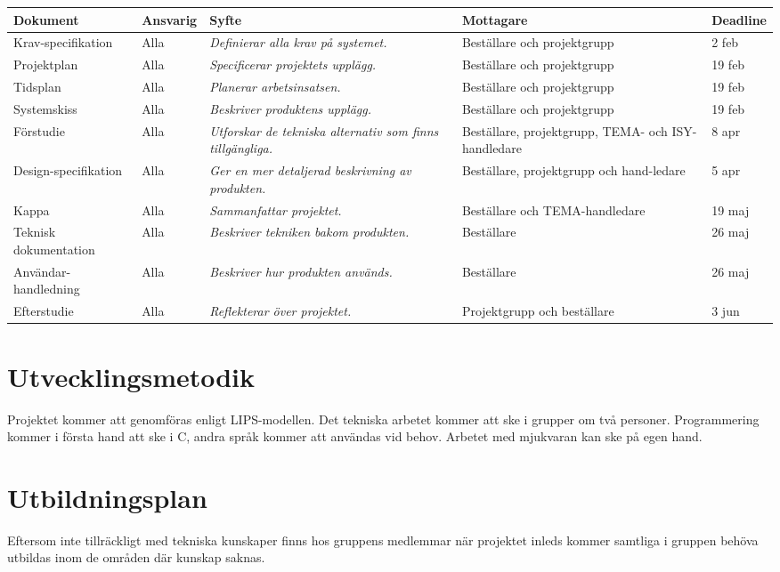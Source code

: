 \documentclass[11pt]{article}
\begin{document}
\begin{flushleft}
\begin{longtable}{| p{.17\linewidth} | p{.11\linewidth} | p{.31\linewidth} | p{.15\linewidth} | p{.11\linewidth} |} \hline
\textbf{Dokument} & \textbf{Ansvarig} & \textbf{Syfte} & \textbf{Mottagare} & \textbf{Deadline} \\ \hline
Krav-specifikation & Alla & \textit{Definierar alla krav på systemet.} & Beställare och projektgrupp & 2 feb \\ \hline
Projektplan & Alla & \textit{Specificerar projektets upplägg.} & Beställare och projektgrupp & 19 feb \\ \hline
Tidsplan & Alla & \textit{Planerar arbetsinsatsen.} & Beställare och projektgrupp & 19 feb \\ \hline
Systemskiss & Alla & \textit{Beskriver produktens upplägg.} & Beställare och projektgrupp & 19 feb \\ \hline
Förstudie & Alla & \textit{Utforskar de tekniska alternativ som finns tillgängliga.} & Beställare, projektgrupp, TEMA- och ISY-handledare & 8 apr \\ \hline
Design-specifikation & Alla & \textit{Ger en mer detaljerad beskrivning av produkten.} & Beställare, projektgrupp och hand-ledare & 5 apr \\ \hline
Kappa & Alla & \textit{Sammanfattar projektet.} & Beställare och TEMA-handledare  & 19 maj \\ \hline
Teknisk \mbox{dokumentation} & Alla & \textit{Beskriver tekniken bakom produkten.} & Beställare & 26 maj\\ \hline
Användar-handledning & Alla & \textit{Beskriver hur produkten används.} & Beställare & 26 maj \\ \hline
Efterstudie & Alla & \textit{Reflekterar över projektet.} & Projektgrupp och beställare & 3 jun \\ \hline

\end{longtable}

\pagebreak
\section{Utvecklingsmetodik}
Projektet kommer att genomföras enligt LIPS-modellen. Det tekniska arbetet kommer att ske i grupper om två personer. Programmering kommer i första hand att ske i C, andra språk kommer att användas vid behov. Arbetet med mjukvaran kan ske på egen hand.

\section{Utbildningsplan}
Eftersom inte tillräckligt med tekniska kunskaper finns hos gruppens medlemmar när projektet inleds kommer samtliga i gruppen behöva utbildas inom de områden där kunskap saknas. 

\end{flushleft}
\end{document}

